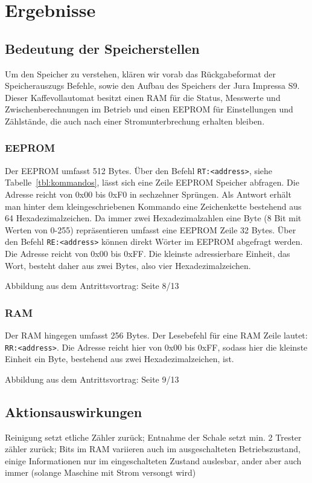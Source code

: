 \chapter{Ergebnisse}

\section{Bedeutung der Speicherstellen}




Um den Speicher zu verstehen, klären wir vorab das Rückgabeformat der Speicherauszugs Befehle, sowie den Aufbau des Speichers der Jura Impressa S9.
Dieser Kaffevollautomat besitzt einen \ac{RAM} für die Status, Messwerte und Zwischenberechnungen im Betrieb und einen \ac{EEPROM} für Einstellungen und Zählstände, die auch nach einer Stromunterbrechung erhalten bleiben.

\subsection{EEPROM}
Der \acf{EEPROM} umfasst 512 Bytes.
Über den Befehl \texttt{RT:<address>}, siehe Tabelle~\ref{tbl:kommandos}, lässt sich eine Zeile \ac{EEPROM} Speicher abfragen.
Die Adresse reicht von 0x00 bis 0xF0 in sechzehner Sprüngen.
Als Antwort erhält man hinter dem kleingeschriebenen Kommando eine Zeichenkette bestehend aus 64 Hexadezimalzeichen.
Da immer zwei Hexadezimalzahlen eine Byte (8 Bit mit Werten von 0-255) repräsentieren umfasst eine \ac{EEPROM} Zeile 32 Bytes.
Über den Befehl \texttt{RE:<address>} können direkt Wörter im \ac{EEPROM} abgefragt werden. Die Adresse reicht von 0x00 bis 0xFF.
Die kleinste adressierbare Einheit, das Wort, besteht daher aus zwei Bytes, also vier Hexadezimalzeichen.

\todo Abbildung aus dem Antrittsvortrag: Seite 8/13

\subsection{RAM}
Der \acf{RAM} hingegen umfasst 256 Bytes.
Der Lesebefehl für eine \ac{RAM} Zeile lautet: \texttt{RR:<address>}.
Die Adresse reicht hier von 0x00 bis 0xFF, sodass hier die kleinste Einheit ein Byte, bestehend aus zwei Hexadezimalzeichen, ist.

\todo Abbildung aus dem Antrittsvortrag: Seite 9/13


\section{Aktionsauswirkungen}
Reinigung setzt etliche Zähler zurück; Entnahme der Schale setzt min.
2 Trester zähler zurück; Bits im RAM variieren auch im ausgeschalteten Betriebszustand, einige Informationen nur im eingeschalteten Zustand auslesbar, ander aber auch immer (solange Maschine mit Strom versongt wird)






